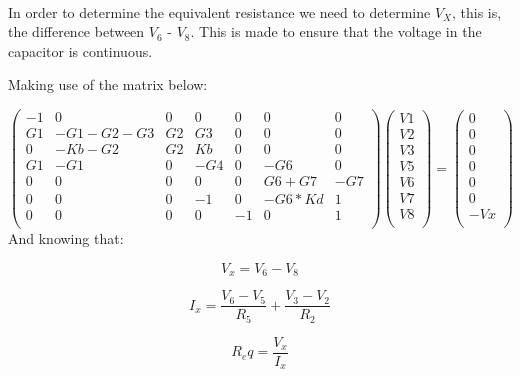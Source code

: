 \paragraph{}In order to determine the equivalent resistance we need to determine $V_X$, this is, the difference between $V_6$ - $V_8$. This is made to ensure that the voltage in the capacitor is continuous.

Making use of the matrix below:

\begin{equation}
\begin{pmatrix}
-1 & 0 & 0 & 0 & 0 & 0 & 0\\
G1 & -G1-G2-G3 & G2 & G3 & 0 & 0 & 0\\
0 & -Kb-G2 & G2 & Kb & 0 & 0 & 0\\
G1 & -G1 & 0 & -G4 & 0 & -G6 & 0\\
0 & 0 & 0 & 0 & 0 & G6+G7 & -G7\\
0 & 0 & 0 & -1 & 0 & -G6*Kd & 1\\
0 & 0 & 0 & 0 & -1 & 0 & 1\\
\end{pmatrix}
\begin{pmatrix}
V1\\
V2\\
V3\\
V5\\
V6\\
V7\\
V8\\
\end{pmatrix}
=
\begin{pmatrix}
0\\
0\\
0\\
0\\
0\\
0\\
-Vx\\
\end{pmatrix}
\end{equation}
\newpage
And knowing that:

\begin{equation}
	V_x = V_6 - V_8
\end{equation}

\begin{equation}
	I_x = \frac{V_6 - V_5}{R_5} + \frac{V_3 - V_2}{R_2}
\end{equation}

\begin{equation}
	R_eq = \frac{V_x}{I_x}
\end{equation}

